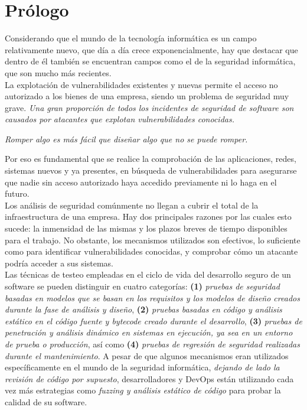 
\section{Prólogo}
Considerando que el mundo de la tecnología informática es un campo relativamente nuevo, que día a día crece exponencialmente, hay que destacar que dentro de él también se encuentran campos como el de la seguridad informática, que son mucho más recientes.\\

La explotación de vulnerabilidades existentes y nuevas permite el acceso no autorizado a los bienes de una empresa, siendo un problema de seguridad muy grave. \textit{Una gran proporción de todos los incidentes de seguridad de software son causados por atacantes que explotan vulnerabilidades conocidas.}\cite{sectesting}

\begin{displayquote}
\textit{Romper algo es más fácil que diseñar algo que no se puede romper.}
\end{displayquote}

Por eso es fundamental que se realice la comprobación de las aplicaciones, redes, sistemas nuevos y ya presentes, en búsqueda de vulnerabilidades para asegurarse que nadie sin acceso autorizado haya accedido previamente ni lo haga en el futuro.\\

Los análisis de seguridad comúnmente no llegan a cubrir el total de la infraestructura de una empresa. Hay dos principales razones por las cuales esto sucede: la inmensidad de las mismas y los plazos breves de tiempo disponibles para el trabajo\cite{krypsys}\cite{specopssoft}\cite{crest}\cite{notsosecure}. No obstante, los mecanismos utilizados son efectivos, lo suficiente como para identificar vulnerabilidades conocidas, y comprobar cómo un atacante podría acceder a sus sistemas.\\

Las técnicas de testeo empleadas en el ciclo de vida del desarrollo seguro de un software se pueden distinguir en cuatro categorías: \textbf{(1)} \textit{pruebas de seguridad basadas en modelos que se basan en los requisitos y los modelos de diseño creados durante la fase de análisis y diseño}, \textbf{(2)} \textit{pruebas basadas en código y análisis estático en el código fuente y bytecode creado durante el desarrollo}, \textbf{(3)} \textit{pruebas de penetración y análisis dinámico en sistemas en ejecución, ya sea en un entorno de prueba o producción}, así como \textbf{(4)} \textit{pruebas de regresión de seguridad realizadas durante el mantenimiento}\cite{sectesting}. A pesar de que algunos mecanismos eran utilizados específicamente en el mundo de la seguridad informática, \textit{dejando de lado la revisión de código por supuesto}, desarrolladores y DevOps están utilizando cada vez más estrategias como \textit{fuzzing y análisis estático de código} para probar la calidad de su software\cite{accelerate_report}\cite{concepts}.

